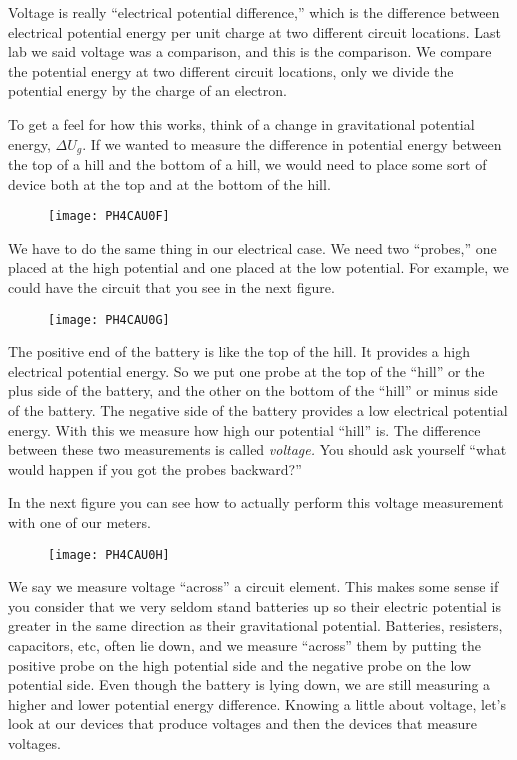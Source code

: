 Voltage is really ``electrical potential
difference,'' which is the difference between electrical
potential energy per unit charge at two different circuit locations. Last
lab we said voltage was a comparison, and this is the comparison. We compare
the potential energy at two different circuit locations, only we divide the
potential energy by the charge of an electron.

To get a feel for how this works, think of a change in gravitational
potential energy, $\Delta U_{g}$. If we wanted to measure the difference in
potential energy between the top of a hill and the bottom of a hill, we
would need to place some sort of device both at the top and at the bottom of
the hill. 
\begin{figure}[h!]
	\centering
	\texttt{[image: PH4CAU0F]}
\end{figure}

We have to do the same thing in
our electrical case. We need two ``probes,'' one placed at the high potential and one placed
at the low potential. For example, we could have the circuit that you see in the next figure.

\begin{figure}[h!]
	\centering
	\texttt{[image: PH4CAU0G]}
\end{figure}

The positive end of the battery is like the top of the hill. It provides a high electrical potential energy. So we put one probe at the top of the ``hill'' or the plus side of the battery, and the other on the bottom of the ``hill'' or minus side of the battery. The negative side of the battery provides a low electrical potential energy. With this we measure how high our potential
``hill'' is. The difference between these two measurements is called \emph{voltage.} You should ask yourself
``what would happen if you got the probes
backward?''

In the next figure you can see how to actually perform this voltage measurement with one of our meters.

\begin{figure}[h!]
	\centering
    \texttt{[image: PH4CAU0H]}
\end{figure}

We say we measure voltage ``across'' a circuit element. This makes some sense if you consider that we very seldom stand batteries up so their electric potential is greater in the same direction as their gravitational potential. Batteries, resisters, capacitors, etc, often lie down, and we measure ``across'' them by putting the positive probe on the high potential side and the negative probe on the low potential side. Even though the battery is lying down, we are still measuring a higher and lower potential energy difference. Knowing a little about voltage, let's look at our devices that produce voltages and then the devices that measure voltages.

